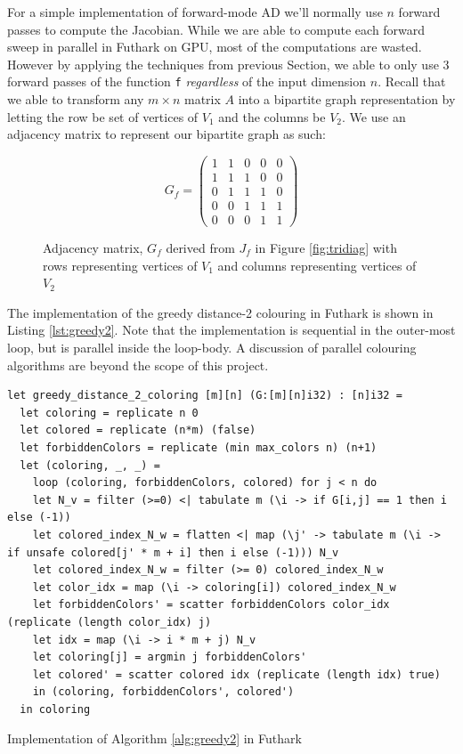 For a simple implementation of forward-mode AD we'll normally use
$n$ forward passes to compute the Jacobian. While we are able to compute each 
forward sweep in parallel in Futhark on GPU, most of the computations are wasted.
However by applying the techniques from previous Section, we able to only use $3$ forward passes
of the function \texttt{f} \emph{regardless} of the input dimension $n$.  
Recall that we able to transform any $m\times n$ matrix $A$ into a bipartite graph 
representation by letting the row be set of vertices of $V_1$ and the columns be $V_2$. 
We use an adjacency matrix to represent our bipartite graph as such:
\begin{figure}[H]
	$$ G_f = \left(\begin{matrix}
     1 & 1 & 0 & 0 & 0 \\
	1 & 1 & 1 & 0 & 0\\
	0 & 1 & 1 & 1 & 0\\
	0 & 0 & 1 & 1 & 1 \\
	0 & 0 & 0 & 1 & 1
	\end{matrix}\right) $$
	\caption{Adjacency matrix, $G_f$ derived from \texttt{$J_f$} in Figure \ref{fig:tridiag} with rows representing vertices of $V_1$ and columns representing vertices of $V_2$}
\end{figure}
The implementation of the greedy distance-2 colouring in Futhark is shown in Listing \ref{lst:greedy2}. Note that the implementation is sequential in the outer-most loop, but is parallel inside the loop-body.  
A  discussion of parallel colouring algorithms are beyond the scope of this project. 
\begin{listing}[H]
	\begin{verbatim}
let greedy_distance_2_coloring [m][n] (G:[m][n]i32) : [n]i32 =
  let coloring = replicate n 0
  let colored = replicate (n*m) (false) 
  let forbiddenColors = replicate (min max_colors n) (n+1)
  let (coloring, _, _) =
    loop (coloring, forbiddenColors, colored) for j < n do
    let N_v = filter (>=0) <| tabulate m (\i -> if G[i,j] == 1 then i else (-1))  
    let colored_index_N_w = flatten <| map (\j' -> tabulate m (\i -> if unsafe colored[j' * m + i] then i else (-1))) N_v
    let colored_index_N_w = filter (>= 0) colored_index_N_w
    let color_idx = map (\i -> coloring[i]) colored_index_N_w   
    let forbiddenColors' = scatter forbiddenColors color_idx (replicate (length color_idx) j)
    let idx = map (\i -> i * m + j) N_v
    let coloring[j] = argmin j forbiddenColors'
    let colored' = scatter colored idx (replicate (length idx) true)
    in (coloring, forbiddenColors', colored')
  in coloring
	\end{verbatim}
	\caption{Implementation of Algorithm \ref{alg:greedy2} in Futhark}
	\label{lst:greedy2}
\end{listing}
